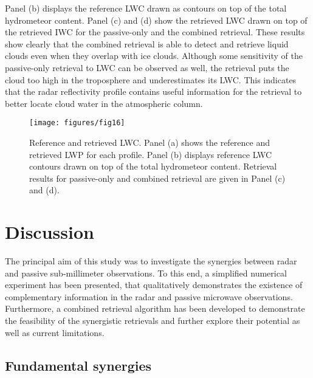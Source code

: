 \documentclass[journal abbreviation, manuscript]{copernicus}
\begin{document}
Panel (b) displays the reference LWC drawn as contours on top of the total
hydrometeor content. Panel (c) and (d) show the retrieved LWC drawn on top of
the retrieved IWC for the passive-only and the combined retrieval. These results
show clearly that the combined retrieval is able to detect and retrieve liquid
clouds even when they overlap with ice clouds. Although some sensitivity of the
passive-only retrieval to LWC can be observed as well, the retrieval puts the
cloud too high in the troposphere and underestimates its LWC. This indicates
that the radar reflectivity profile contains useful information for the
retrieval to better locate cloud water in the atmospheric column.

\begin{figure}
\centering
\texttt{[image: figures/fig16]}
\caption{Reference and retrieved LWC. Panel (a) shows the reference and retrieved
  LWP for each profile. Panel (b) displays reference LWC contours drawn on top
  of the total hydrometeor content. Retrieval results for passive-only and combined
  retrieval are given in Panel (c) and (d).}
\label{fig:results_cw_b}
\end{figure}


\section{Discussion}
\label{sec:discussion}

The principal aim of this study was to investigate the synergies between radar
and passive sub-millimeter observations. To this end, a simplified numerical
experiment has been presented, that qualitatively demonstrates the existence of
complementary information in the radar and passive microwave observations.
Furthermore, a combined retrieval algorithm has been developed to demonstrate
the feasibility of the synergistic retrievals and further explore their
potential as well as current limitations.

\subsection{Fundamental synergies}
\end{document}
